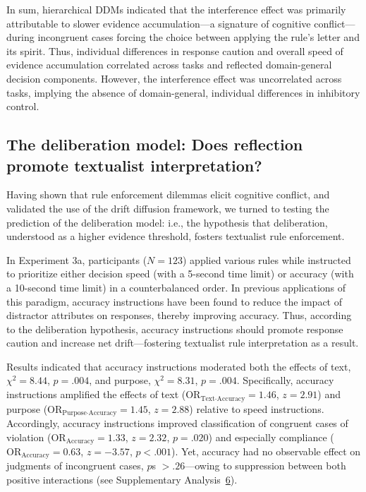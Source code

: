 \documentclass[pdflatex,sn-nature]{sn-jnl}
\begin{document}
In sum, hierarchical DDMs indicated that the interference effect was primarily attributable to slower evidence accumulation---a signature of cognitive conflict\cite{ref17}---during incongruent cases forcing the choice between applying the rule's letter and its spirit. Thus, individual differences in response caution and overall speed of evidence accumulation correlated across tasks and reflected domain-general decision components. However, the interference effect was uncorrelated across tasks, implying the absence of domain-general, individual differences in inhibitory control. 

\subsection{The deliberation model: Does reflection promote textualist interpretation?}\label{subsec:deliberation}

Having shown that rule enforcement dilemmas elicit cognitive conflict, and validated the use of the drift diffusion framework, we turned to testing the prediction of the deliberation model: i.e., the hypothesis that deliberation, understood as a higher evidence threshold, fosters textualist rule enforcement. 

In Experiment 3a, participants ($N = 123$) applied various rules while instructed to prioritize either decision speed (with a 5-second time limit) or accuracy (with a 10-second time limit) in a counterbalanced order. In previous applications of this paradigm, accuracy instructions have been found to reduce the impact of distractor attributes on responses, thereby improving accuracy\cite{ref18}. Thus, according to the deliberation hypothesis, accuracy instructions should promote response caution and increase net drift---fostering textualist rule interpretation as a result.

Results indicated that accuracy instructions moderated both the effects of text, $\chi^2 = 8.44$, $p = .004$, and purpose, $\chi^2 = 8.31$, $p = .004$. Specifically, accuracy instructions amplified the effects of text ($\mathrm{OR}_{\text{Text}{\cdot}\text{Accuracy}} = 1.46$, $z = 2.91$) and purpose ($\mathrm{OR}_{\text{Purpose}{\cdot}\text{Accuracy}} = 1.45$, $z = 2.88$) relative to speed instructions. Accordingly, accuracy instructions improved classification of congruent cases of violation ($\mathrm{OR}_\text{Accuracy} = 1.33$, $z = 2.32$, $p = .020$) and especially compliance ($\mathrm{OR}_\text{Accuracy} = 0.63$, $z = -3.57$, $p < .001$). Yet, accuracy had no observable effect on judgments of incongruent cases, $p$s $> .26$---owing to suppression between both positive interactions (see Supplementary Analysis~\hyperref[supp:analysis6]{6}).
\end{document}
